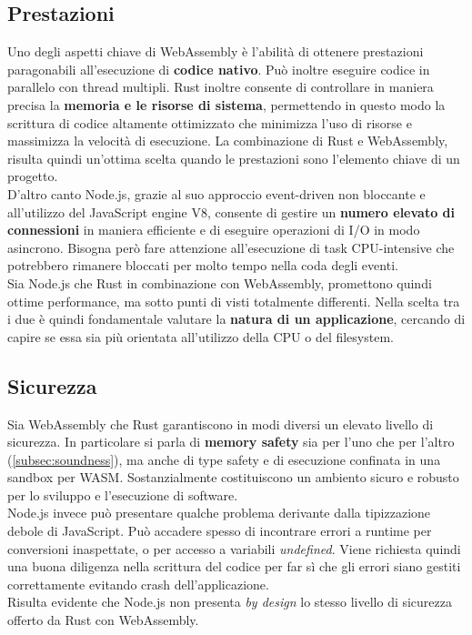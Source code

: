 \subsection{Prestazioni}
Uno degli aspetti chiave di WebAssembly è l'abilità di ottenere prestazioni paragonabili all'esecuzione di \textbf{codice nativo}.
Può inoltre eseguire codice in parallelo con thread multipli.
Rust inoltre consente di controllare in maniera precisa la \textbf{memoria e le risorse di sistema}, permettendo in questo modo la scrittura di codice altamente ottimizzato che minimizza l'uso di risorse e massimizza la velocità di esecuzione.
La combinazione di Rust e WebAssembly, risulta quindi un'ottima scelta quando le prestazioni sono l'elemento chiave di un progetto.
\\D'altro canto Node.js, grazie al suo approccio event-driven non bloccante e all'utilizzo del JavaScript engine V8, consente di gestire un \textbf{numero elevato di connessioni} in maniera efficiente e di eseguire operazioni di I/O in modo asincrono.
Bisogna però fare attenzione all'esecuzione di task CPU-intensive che potrebbero rimanere bloccati per molto tempo nella coda degli eventi.
\\Sia Node.js che Rust in combinazione con WebAssembly, promettono quindi ottime performance, ma sotto punti di visti totalmente differenti.
Nella scelta tra i due è quindi fondamentale valutare la \textbf{natura di un applicazione}, cercando di capire se essa sia più orientata all'utilizzo della CPU o del filesystem.
\subsection{Sicurezza}
Sia WebAssembly che Rust garantiscono in modi diversi un elevato livello di sicurezza. In particolare si parla di \textbf{memory safety} sia per l'uno che per l'altro (\ref{subsec:soundness}), ma anche di type safety e di esecuzione confinata in una sandbox per WASM. 
Sostanzialmente costituiscono un ambiento sicuro e robusto per lo sviluppo e l'esecuzione di software.
\\Node.js invece può presentare qualche problema derivante dalla tipizzazione debole di JavaScript. Può accadere spesso di incontrare errori a runtime per conversioni inaspettate, o per accesso a variabili \emph{undefined}.
Viene richiesta quindi una buona diligenza nella scrittura del codice per far sì che gli errori siano gestiti correttamente evitando crash dell'applicazione.
\\Risulta evidente che Node.js non presenta \emph{by design} lo stesso livello di sicurezza offerto da Rust con WebAssembly.
